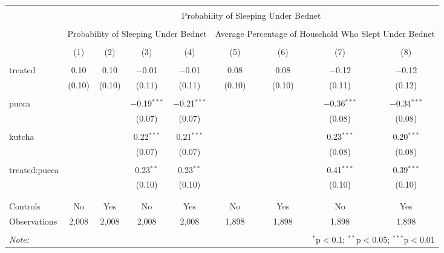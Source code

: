
\begin{table}[!htbp] \centering 
  \caption{} 
  \label{} 
\begin{tabular}{@{\extracolsep{5pt}}lcccccccc} 
\\[-1.8ex]\hline 
\hline \\[-1.8ex] 
 & \multicolumn{8}{c}{Probability of Sleeping Under Bednet} \\ 
\cline{2-9} 
\\[-1.8ex] & \multicolumn{4}{c}{Probability of Sleeping Under Bednet} & \multicolumn{4}{c}{Average Percentage of Household Who Slept Under Bednet} \\ 
\\[-1.8ex] & (1) & (2) & (3) & (4) & (5) & (6) & (7) & (8)\\ 
\hline \\[-1.8ex] 
 treated & 0.10 & 0.10 & $-$0.01 & $-$0.01 & 0.08 & 0.08 & $-$0.12 & $-$0.12 \\ 
  & (0.10) & (0.10) & (0.11) & (0.11) & (0.10) & (0.10) & (0.11) & (0.12) \\ 
  & & & & & & & & \\ 
 pucca &  &  & $-$0.19$^{***}$ & $-$0.21$^{***}$ &  &  & $-$0.36$^{***}$ & $-$0.34$^{***}$ \\ 
  &  &  & (0.07) & (0.07) &  &  & (0.08) & (0.08) \\ 
  & & & & & & & & \\ 
 kutcha &  &  & 0.22$^{***}$ & 0.21$^{***}$ &  &  & 0.23$^{***}$ & 0.20$^{***}$ \\ 
  &  &  & (0.07) & (0.07) &  &  & (0.08) & (0.08) \\ 
  & & & & & & & & \\ 
 treated:pucca &  &  & 0.23$^{**}$ & 0.23$^{**}$ &  &  & 0.41$^{***}$ & 0.39$^{***}$ \\ 
  &  &  & (0.10) & (0.10) &  &  & (0.10) & (0.10) \\ 
  & & & & & & & & \\ 
\hline \\[-1.8ex] 
Controls & No & Yes & No & Yes & No & Yes & No & Yes \\ 
Observations & 2,008 & 2,008 & 2,008 & 2,008 & 1,898 & 1,898 & 1,898 & 1,898 \\ 
\hline 
\hline \\[-1.8ex] 
\textit{Note:}  & \multicolumn{8}{r}{$^{*}$p$<$0.1; $^{**}$p$<$0.05; $^{***}$p$<$0.01} \\ 
\end{tabular} 
\end{table} 
